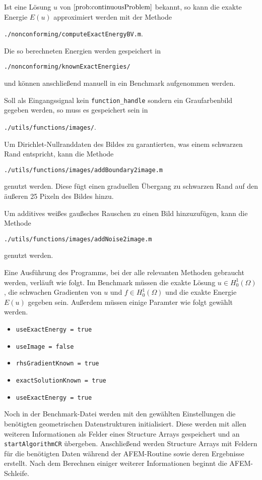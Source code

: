 Ist eine Lösung $u$ von $\Cref{prob:continuousProblem}$ bekannt, so kann die
exakte Energie $E(u)$ approximiert werden mit der Methode
\begin{center}
  \texttt{./nonconforming/computeExactEnergyBV.m}.
\end{center}
Die so berechneten Energien werden gespeichert in 
\begin{center}
  \texttt{./nonconforming/knownExactEnergies/}
\end{center}
und können anschließend manuell in ein Benchmark aufgenommen werden.

Soll als Eingangssignal kein \texttt{function\_handle} sondern ein
Graufarbenbild gegeben werden, so muss es gespeichert sein in 
\begin{center}
  \texttt{./utils/functions/images/}.
\end{center}
Um Dirichlet-Nullranddaten des Bildes zu garantierten, was einem schwarzen Rand
entspricht, kann die Methode 
\begin{center}
  \texttt{./utils/functions/images/addBoundary2image.m}
\end{center}
genutzt werden. Diese fügt einen graduellen Übergang zu schwarzen Rand auf den 
äußeren 25 Pixeln des Bildes hinzu.

Um additives weißes gaußsches Rauschen zu einen Bild hinzuzufügen, kann die
Methode
\begin{center}
  \texttt{./utils/functions/images/addNoise2image.m}
\end{center}
genutzt werden. 

Eine Ausführung des Programms, bei der alle relevanten Methoden gebraucht
werden, verläuft wie folgt. 
Im Benchmark müssen die exakte Lösung $u\in H^1_0(\Omega)$, die schwachen
Gradienten von $u$ und $f\in H^1_0(\Omega)$ und die exakte Energie
$E(u)$ gegeben sein. 
Außerdem müssen einige Paramter wie folgt gewählt werden.
\begin{itemize}
  \item \texttt{useExactEnergy = true}
  \item \texttt{useImage = false}
  \item \texttt{rhsGradientKnown = true}
  \item \texttt{exactSolutionKnown = true}
  \item \texttt{useExactEnergy = true}
\end{itemize}
Noch in der Benchmark-Datei werden mit den gewählten Einstellungen die
benötigten geometrischen Datenstrukturen initialisiert. 
Diese werden mit 
allen weiteren Informationen als Felder eines Structure Arrays
gespeichert und an \texttt{startAlgorithmCR} übergeben. 
Anschließend werden Structure Arrays mit Feldern für die benötigten Daten
während der AFEM-Routine sowie deren Ergebnisse erstellt. 
Nach dem Berechnen einiger weiterer Informationen beginnt die AFEM-Schleife.

